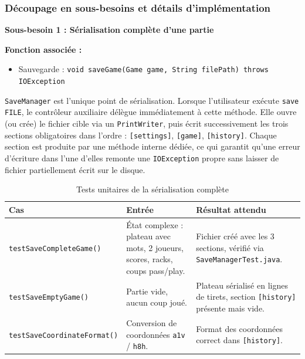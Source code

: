 \documentclass[a4paper]{article}
\begin{document}
\subsubsection{Découpage en sous-besoins et détails d'implémentation}

\begin{besoinbox}
    \textbf{\large Sous-besoin 1 : Sérialisation complète d'une partie}

    \vspace{2mm}
    \textbf{Fonction associée :}
    \begin{itemize}
        \item Sauvegarde : \texttt{void saveGame(Game game, String filePath) throws IOException}
    \end{itemize}
    \vspace{2mm}

    \texttt{SaveManager} est l'unique point de sérialisation. Lorsque l'utilisateur exécute \texttt{save FILE}, le contrôleur auxiliaire délègue immédiatement à cette méthode. Elle ouvre (ou crée) le fichier cible via un \texttt{PrintWriter}, puis écrit successivement les trois sections obligatoires dans l'ordre : \texttt{[settings]}, \texttt{[game]}, \texttt{[history]}. Chaque section est produite par une méthode interne dédiée, ce qui garantit qu'une erreur d'écriture dans l'une d'elles remonte une \texttt{IOException} propre sans laisser de fichier partiellement écrit sur le disque.
\end{besoinbox}

\begin{table}[H]
    \centering
    \small
    \begin{tabular}{p{4.5cm} p{4.5cm} p{5.5cm}}
        \toprule
        \textbf{Cas} & \textbf{Entrée} & \textbf{Résultat attendu} \\
        \midrule
        \texttt{testSaveCompleteGame()} & État complexe : plateau avec mots, 2 joueurs, scores, racks, coups pass/play. & Fichier créé avec les 3 sections, vérifié via \texttt{SaveManagerTest.java}. \\
        \midrule
        \texttt{testSaveEmptyGame()} & Partie vide, aucun coup joué. & Plateau sérialisé en lignes de tirets, section \texttt{[history]} présente mais vide. \\
        \midrule
        \texttt{testSaveCoordinateFormat()} & Conversion de coordonnées \texttt{a1v} / \texttt{h8h}. & Format des coordonnées correct dans \texttt{[history]}. \\
        \bottomrule
    \end{tabular}
    \caption{Tests unitaires de la sérialisation complète}
\end{table}
\end{document}
